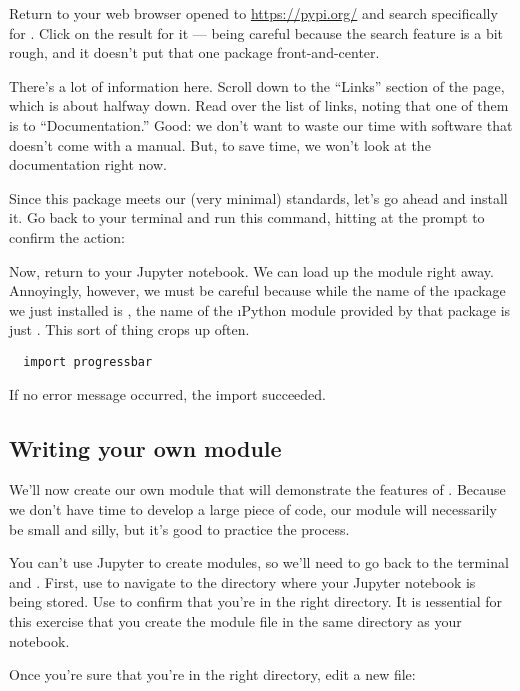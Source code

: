 \documentclass[letterpaper, 12pt, titlepage, twoside]{article}
\begin{document}
Return to your web browser opened to \url{https://pypi.org/} and search
specifically for . Click on the result for it --- being
careful because the search feature is a bit rough, and it doesn't put that one
package front-and-center.

There's a lot of information here. Scroll down to the ``Links'' section of the
page, which is about halfway down. Read over the list of links, noting that
one of them is to ``Documentation.'' Good: we don't want to waste our time
with software that doesn't come with a manual. But, to save time, we won't
look at the documentation right now.

Since this package meets our (very minimal) standards, let's go ahead and
install it. Go back to your terminal and run this command, hitting 
at the prompt to confirm the action:


Now, return to your Jupyter notebook. We can load up the module right away.
Annoyingly, however, we must be careful because while the name of the
\i{package} we just installed is , the name of the \i{Python
  module} provided by that package is just . This sort of thing
crops up often.

\begin{lstlisting}
  import progressbar
\end{lstlisting}

If no error message occurred, the import succeeded.

\subsection*{Writing your own module}

We'll now create our own module that will demonstrate the features of
. Because we don't have time to develop a large piece of code,
our module will necessarily be small and silly, but it's good to practice the
process.

You can't use Jupyter to create modules, so we'll need to go back to the
terminal and . First, use  to navigate to the directory where
your Jupyter notebook is being stored. Use  to confirm that you're in
the right directory. It is \i{essential} for this exercise that you create the
module file in the same directory as your notebook.

Once you're sure that you're in the right directory, edit a new file:
\end{document}
